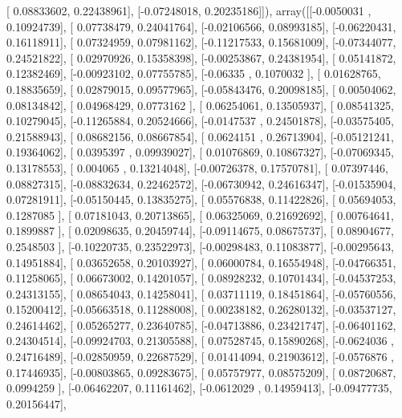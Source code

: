 \documentclass{article}
\begin{document}
       [ 0.08833602,  0.22438961],
       [-0.07248018,  0.20235186]]), array([[-0.0050031 ,  0.10924739],
       [ 0.07738479,  0.24041764],
       [-0.02106566,  0.08993185],
       [-0.06220431,  0.16118911],
       [ 0.07324959,  0.07981162],
       [-0.11217533,  0.15681009],
       [-0.07344077,  0.24521822],
       [ 0.02970926,  0.15358398],
       [-0.00253867,  0.24381954],
       [ 0.05141872,  0.12382469],
       [-0.00923102,  0.07755785],
       [-0.06335   ,  0.1070032 ],
       [ 0.01628765,  0.18835659],
       [ 0.02879015,  0.09577965],
       [-0.05843476,  0.20098185],
       [ 0.00504062,  0.08134842],
       [ 0.04968429,  0.0773162 ],
       [ 0.06254061,  0.13505937],
       [ 0.08541325,  0.10279045],
       [-0.11265884,  0.20524666],
       [-0.0147537 ,  0.24501878],
       [-0.03575405,  0.21588943],
       [ 0.08682156,  0.08667854],
       [ 0.0624151 ,  0.26713904],
       [-0.05121241,  0.19364062],
       [ 0.0395397 ,  0.09939027],
       [ 0.01076869,  0.10867327],
       [-0.07069345,  0.13178553],
       [ 0.004065  ,  0.13214048],
       [-0.00726378,  0.17570781],
       [ 0.07397446,  0.08827315],
       [-0.08832634,  0.22462572],
       [-0.06730942,  0.24616347],
       [-0.01535904,  0.07281911],
       [-0.05150445,  0.13835275],
       [ 0.05576838,  0.11422826],
       [ 0.05694053,  0.1287085 ],
       [ 0.07181043,  0.20713865],
       [ 0.06325069,  0.21692692],
       [ 0.00764641,  0.1899887 ],
       [ 0.02098635,  0.20459744],
       [-0.09114675,  0.08675737],
       [ 0.08904677,  0.2548503 ],
       [-0.10220735,  0.23522973],
       [-0.00298483,  0.11083877],
       [-0.00295643,  0.14951884],
       [ 0.03652658,  0.20103927],
       [ 0.06000784,  0.16554948],
       [-0.04766351,  0.11258065],
       [ 0.06673002,  0.14201057],
       [ 0.08928232,  0.10701434],
       [-0.04537253,  0.24313155],
       [ 0.08654043,  0.14258041],
       [ 0.03711119,  0.18451864],
       [-0.05760556,  0.15200412],
       [-0.05663518,  0.11288008],
       [ 0.00238182,  0.26280132],
       [-0.03537127,  0.24614462],
       [ 0.05265277,  0.23640785],
       [-0.04713886,  0.23421747],
       [-0.06401162,  0.24304514],
       [-0.09924703,  0.21305588],
       [ 0.07528745,  0.15890268],
       [-0.0624036 ,  0.24716489],
       [-0.02850959,  0.22687529],
       [ 0.01414094,  0.21903612],
       [-0.0576876 ,  0.17446935],
       [-0.00803865,  0.09283675],
       [ 0.05757977,  0.08575209],
       [ 0.08720687,  0.0994259 ],
       [-0.06462207,  0.11161462],
       [-0.0612029 ,  0.14959413],
       [-0.09477735,  0.20156447],
\end{document}
